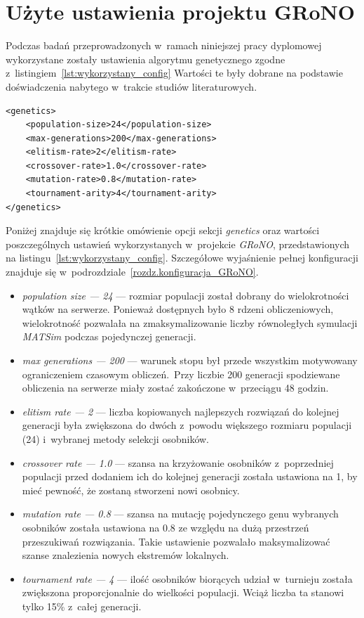 \documentclass[twoside,12pt]{report}
\begin{document}
\section{Użyte ustawienia projektu GRoNO}
Podczas badań przeprowadzonych w~ramach niniejszej pracy dyplomowej wykorzystane zostały ustawienia algorytmu genetycznego zgodne z~listingiem~\ref{lst:wykorzystany_config} Wartości te były dobrane na podstawie doświadczenia nabytego w~trakcie studiów literaturowych. 
	
\begin{lstlisting}[caption=Ustawienia algorytmu genetycznego użytego podczas badań, label=lst:wykorzystany_config]
<genetics>
	<population-size>24</population-size>
	<max-generations>200</max-generations>
	<elitism-rate>2</elitism-rate>
	<crossover-rate>1.0</crossover-rate>
	<mutation-rate>0.8</mutation-rate>
	<tournament-arity>4</tournament-arity>
</genetics>
\end{lstlisting}

Poniżej znajduje się krótkie omówienie opcji sekcji \textit{genetics} oraz wartości poszczególnych ustawień wykorzystanych w~projekcie \textit{GRoNO}, przedstawionych na listingu~\ref{lst:wykorzystany_config}. Szczegółowe wyjaśnienie pełnej konfiguracji znajduje się w~podrozdziale~\ref{rozdz.konfiguracja_GRoNO}.
\begin{itemize}
\item \textit{population size --- 24} --- rozmiar populacji został dobrany do wielokrotności wątków na serwerze. Ponieważ dostępnych było 8 rdzeni obliczeniowych, wielokrotność pozwalała na zmaksymalizowanie liczby równoległych symulacji \textit{MATSim} podczas pojedynczej generacji.

\item \textit{max generations --- 200} --- warunek stopu był przede wszystkim motywowany ograniczeniem czasowym obliczeń.~Przy liczbie 200 generacji spodziewane obliczenia na serwerze miały zostać zakończone w~przeciągu 48 godzin.

\item \textit{elitism rate --- 2} --- liczba kopiowanych najlepszych rozwiązań do kolejnej generacji była zwiększona do dwóch z~powodu większego rozmiaru populacji (24) i~wybranej metody selekcji osobników.

\item \textit{crossover rate --- 1.0} --- szansa na krzyżowanie osobników z~poprzedniej populacji przed dodaniem ich do kolejnej generacji została ustawiona na 1, by mieć pewność, że zostaną stworzeni nowi osobnicy.

\item \textit{mutation rate --- 0.8} --- szansa na mutację pojedynczego genu wybranych osobników została ustawiona na 0.8 ze względu na dużą przestrzeń przeszukiwań rozwiązania. Takie ustawienie pozwalało maksymalizować szanse znalezienia nowych ekstremów lokalnych.

\item \textit{tournament rate --- 4} --- ilość osobników biorących udział w~turnieju została zwiększona proporcjonalnie do wielkości populacji. Wciąż liczba ta stanowi tylko 15\% z~całej generacji.
\end{itemize}
\end{document}
